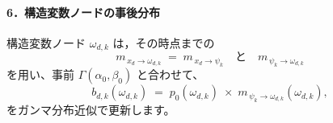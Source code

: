 \documentclass[oneside,onecolumn]{jlreq}
\theoremstyle{plain}
\begin{document}
\paragraph{6．構造変数ノードの事後分布}
構造変数ノード \(\omega_{d,k}\) は，その時点までの
\[
    m_{\,x_d\to \omega_{d,k}}
    \;=\; m_{\,x_d\to \psi_k}\quad\text{と}\quad
    m_{\,\psi_k\to \omega_{d,k}}
\]
を用い、事前 \(\Gamma(\alpha_0,\beta_0)\) と合わせて、
\[
    b_{d,k}(\omega_{d,k})
    \;=\;
    p_0(\omega_{d,k})
    \;\times\;
    m_{\,\psi_k \to \omega_{d,k}}(\omega_{d,k}),
\]
をガンマ分布近似で更新します。
\end{document}
